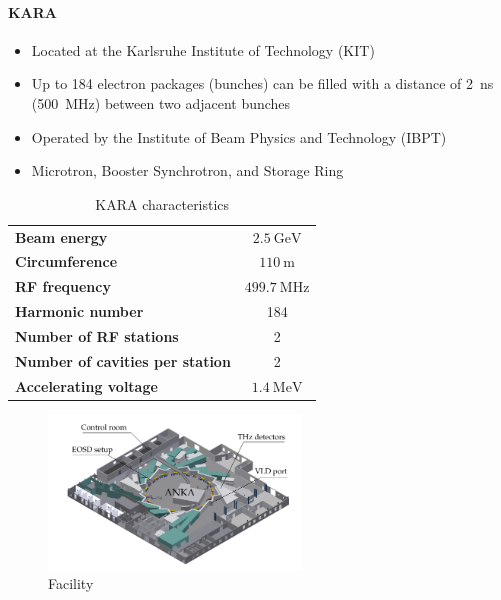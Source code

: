 \paragraph{KARA}
\begin{itemize}
	\item Located at the Karlsruhe Institute of Technology (KIT)
	\item Up to 184 electron packages (bunches) can be filled with a distance of \SI{2}{\nano \second} (\SI{500}{\mega \hertz}) between two adjacent bunches 
	\item Operated by the Institute of Beam Physics and Technology (IBPT)
	\item Microtron, Booster Synchrotron, and Storage Ring
\end{itemize}

\begin{table}[tbh!]
	\caption{KARA characteristics}
	\label{tab:kara}
	\begin{minipage}{\textwidth}
		\centering
		\begin{tabularx}{\textwidth}{XS}
			\toprule
			\textbf{Beam energy}     				& $ \SI{2.5}{\giga \electronvolt}$ \\
			\textbf{Circumference} 	 				& $\SI{110}{\meter}$	  \\
			\textbf{RF frequency }   				& $\SI{499.7}{\mega \hertz}$ 	\\
			\textbf{Harmonic number} 				& 184	\\
			\textbf{Number of RF stations} 			& 2 \\
			\textbf{Number of cavities per station} 	& 2	\\
			\textbf{Accelerating voltage} 					& $\SI{1.4}{\mega \electronvolt}$ \\
			\bottomrule		\end{tabularx}
	\end{minipage}
\end{table}



\begin{figure}[H]
	\centering
	\includegraphics[width = 0.6\textwidth]{chap/02-theory/img/kara.png}
	\caption{Facility \cite{rota2018}}
	\label{fig:kara}
\end{figure}

